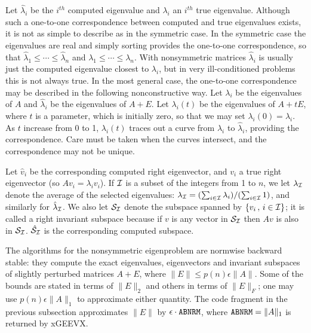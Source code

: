 \newcommand{\calSI}{{\cal S}_{\cal I}}
\newcommand{\hatcalSI}{{\hat{\cal S}}_{\cal I}}
Let $\hat{\lambda}_i$ be the $i^{th}$ computed eigenvalue and
$\lambda_i$ an $i^{th}$ true eigenvalue. Although such a one-to-one
correspondence between computed and true eigenvalues exists, it is not as
simple to describe as in the symmetric case. In the symmetric case the eigenvalues
are real and simply sorting provides the one-to-one correspondence,
so that $\hat{\lambda}_1 \leq \cdots \leq \hat{\lambda}_n$
and $\lambda_1 \leq \cdots \leq \lambda_n$. With nonsymmetric matrices
$\hat{\lambda}_i$ is usually just the computed eigenvalue closest to
$\lambda_i$, but in very ill-conditioned problems this is not always true.
In the most general case, the one-to-one correspondence may be described
in the following nonconstructive way. Let $\lambda_i$ be the eigenvalues
of $A$ and $\hat{\lambda}_i$ be the eigenvalues of $A+E$. Let
$\lambda_i(t)$ be the eigenvalues of $A+tE$, where $t$ is a parameter,
which is initially zero, so that we may set $\lambda_i (0) = \lambda_i$.
As $t$ increase from 0 to 1, $\lambda_i (t)$ traces out a curve from
$\lambda_i$ to $\hat{\lambda}_i$, providing the correspondence.
Care must be taken when the curves intersect, and the correspondence
may not be unique.

Let $\hat{v}_i$ be the
corresponding computed right eigenvector, and $v_i$ a true right
eigenvector (so $Av_i = \lambda_i v_i$).
If $\cal I$ is a subset of the
integers from 1 to $n$, we let $\lambda_{\cal I}$ denote the average of
the selected eigenvalues:
$\lambda_{\cal I} = (\sum_{i \in \cal I} \lambda_i)/(\sum_{i \in \cal I} 1)$,
and similarly for $\hat{\lambda}_{\cal I}$. We also let $\calSI$
denote the subspace spanned by $\{ v_i \, , \, i \in \cal I \}$; it is
called a right invariant subspace because if $v$ is any vector in $\calSI$ then
$Av$ is also in $\calSI$. $\hatcalSI$ is the corresponding computed subspace.

The algorithms for the nonsymmetric eigenproblem are normwise backward stable:
they compute the exact eigenvalues, eigenvectors and invariant subspaces
of slightly perturbed matrices $A+E$, where $\|E\| \leq p(n) \epsilon \|A\|$.
Some of the bounds are stated in terms of $\|E\|_2$ and others in
terms of $\|E\|_F$; one may use $p(n) \epsilon \|A\|_1$ to approximate
either quantity.
The code fragment in the previous subsection approximates
$\|E\|$ by $\epsilon \cdot {\tt ABNRM}$, where ${\tt ABNRM} = \|A\|_1$
is returned by xGEEVX.


